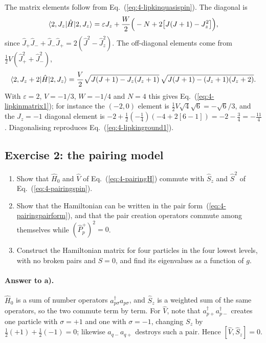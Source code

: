 The matrix elements follow from Eq.~(\ref{eq:4-lipkinquasispin}).  The
diagonal is
\begin{equation}
  \langle 2,J_z | \hat{H} | 2,J_z \rangle
   = \varepsilon J_z + \frac{W}{2}\Big(-N + 2\big[J(J+1)-J_z^2\big]\Big),
  \label{eq:4-exd2}
\end{equation}
since $\hat{J}_+\hat{J}_-+\hat{J}_-\hat{J}_+=2(\hat{J}^2-\hat{J}_z^2)$.  The
off-diagonal elements come from $\tfrac12 V(\hat{J}_+^2+\hat{J}_-^2)$,
\begin{equation}
  \langle 2,J_z+2 | \hat{H} | 2,J_z \rangle
   = \frac{V}{2}\sqrt{J(J+1)-J_z(J_z+1)}\,
     \sqrt{J(J+1)-(J_z+1)(J_z+2)} .
  \label{eq:4-exd3}
\end{equation}
With $\varepsilon=2$, $V=-1/3$, $W=-1/4$ and $N=4$ this gives
Eq.~(\ref{eq:4-lipkinmatrix1}); for instance the $(-2,0)$ element is
$\tfrac12 V\sqrt{4}\sqrt{6}=-\sqrt6/3$, and the $J_z=-1$ diagonal element is
$-2+\tfrac12(-\tfrac14)(-4+2[6-1])=-2-\tfrac34=-\tfrac{11}{4}$.
Diagonalising reproduces Eq.~(\ref{eq:4-lipkinground1}).

\subsection*{Exercise 2: the pairing model}
\label{ex:4-pairing}

\begin{enumerate}
  \item[a)] Show that $\hat{H}_0$ and $\hat{V}$ of Eq.~(\ref{eq:4-pairingH})
  commute with $\hat{S}_z$ and $\hat{S}^2$ of Eq.~(\ref{eq:4-pairingspin}).
  \item[b)] Show that the Hamiltonian can be written in the pair
  form~(\ref{eq:4-pairingpairform}), and that the pair creation operators
  commute among themselves while $(\hat{P}^{+}_p)^2=0$.
  \item[c)] Construct the Hamiltonian matrix for four particles in the four
  lowest levels, with no broken pairs and $S=0$, and find its eigenvalues as a
  function of $g$.
\end{enumerate}

\paragraph{Answer to a).}
$\hat{H}_0$ is a sum of number operators $a^{\dagger}_{p\sigma}
a_{p\sigma}$, and $\hat{S}_z$ is a weighted sum of the same operators, so the
two commute term by term.  For $\hat{V}$, note that
$a^{\dagger}_{p+}a^{\dagger}_{p-}$ creates one particle with $\sigma=+1$ and
one with $\sigma=-1$, changing $S_z$ by $\tfrac12(+1)+\tfrac12(-1)=0$;
likewise $a_{q-}a_{q+}$ destroys such a pair.  Hence $[\hat{V},\hat{S}_z]=0$.

